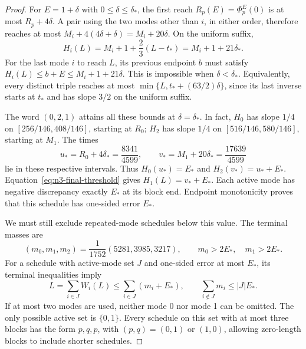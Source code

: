 \begin{proof}
For $E=1+\delta$ with $0\le\delta\le\delta_*$, the first reach
$R_p(E)=\Phi_p^E(0)$ is at most $R_p+4\delta$. A pair using the two
modes other than $i$, in either order, therefore reaches at most
$M_i+4(4\delta+\delta)=M_i+20\delta$.
On the uniform suffix,
\begin{equation}\label{eq:n3-final-threshold}
 H_i(L)=M_i+1+\frac23(L-t_*)=M_i+1+21\delta_*.
\end{equation}
For the last mode $i$ to reach $L$, its previous endpoint $b$ must satisfy
$H_i(L)\le b+E\le M_i+1+21\delta$. This is impossible when
$\delta<\delta_*$. Equivalently, every distinct triple reaches at most
$\min\{L,t_*+(63/2)\delta\}$, since its last inverse starts at $t_*$
and has slope $3/2$ on the uniform suffix.

The word $(0,2,1)$ attains all these bounds at $\delta=\delta_*$. In fact,
$H_0$ has slope $1/4$ on $[256/146,408/146]$, starting at $R_0$;
$H_2$ has slope $1/4$ on $[516/146,580/146]$, starting at $M_1$.
The times
\begin{equation}\label{eq:n3-optimal-times}
 u_*=R_0+4\delta_*=\frac{8341}{4599},\qquad
 v_*=M_1+20\delta_*=\frac{17639}{4599}
\end{equation}
lie in these respective intervals. Thus $H_0(u_*)=E_*$ and
$H_2(v_*)=u_*+E_*$. Equation~\eqref{eq:n3-final-threshold} gives
$H_1(L)=v_*+E_*$. Each active mode has negative discrepancy exactly
$E_*$ at its block end. Endpoint monotonicity proves that this schedule
has one-sided error $E_*$.

We must still exclude repeated-mode schedules below this value. The terminal
masses are
\begin{equation}\label{eq:n3-terminal}
 (m_0,m_1,m_2)=\frac1{1752}(5281,3985,3217),
 \qquad m_0>2E_*,\quad m_1>2E_*.
\end{equation}
For a schedule with active-mode set $J$ and one-sided error at most $E_*$,
its terminal inequalities imply
\[
 L=\sum_{i\in J}W_i(L)\le\sum_{i\in J}(m_i+E_*),
 \qquad \sum_{i\notin J}m_i\le |J|E_*.
\]
If at most two modes are used, neither mode 0 nor mode 1 can be omitted.
The only possible active set is $\{0,1\}$. Every schedule on this set
with at most three blocks has the form $p,q,p$, with $(p,q)=(0,1)$ or
$(1,0)$, allowing zero-length blocks to include shorter schedules.


\end{proof}
